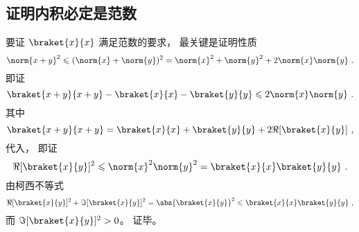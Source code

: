 \subsection{证明内积必定是范数}
要证 $\braket{x}{x}$ 满足范数的要求， 最关键是证明性质
\begin{equation}
\norm{x+y}^2 \leqslant (\norm{x} + \norm{y})^2 = \norm{x}^2 + \norm{y}^2 + 2\norm{x}\norm{y}~.
\end{equation}
即证
\begin{equation}
\braket{x+y}{x+y} - \braket{x}{x} - \braket{y}{y} \leqslant 2\norm{x}\norm{y}~.
\end{equation}
其中
\begin{equation}
\braket{x+y}{x+y} = \braket{x}{x} + \braket{y}{y} + 2\Re[{\braket{x}{y}}]~,
\end{equation}
代入， 即证
\begin{equation}\label{InerPd_eq5}
\Re[{\braket{x}{y}}]^2 \leqslant \norm{x}^2\norm{y}^2 = \braket{x}{x}\braket{y}{y}~.
\end{equation}
由柯西不等式
\begin{equation}
\Re[\braket{x}{y}]^2 + \Im[\braket{x}{y}]^2 = \abs{\braket{x}{y}}^2 \leqslant \braket{x}{x}\braket{y}{y}~,
\end{equation}
而 $\Im[\braket{x}{y}]^2 > 0$。 证毕。
